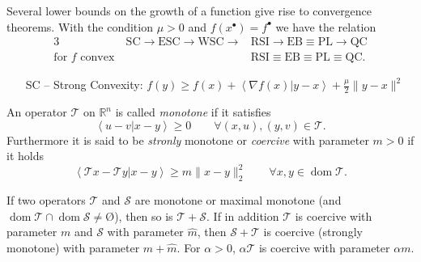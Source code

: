 \documentclass[varwidth=15cm, border=.5cm]{standalone}
\DeclareMathOperator{\domain}{dom}
\newcommand{\innerp}[2]{\left\langle #1 \vert #2 \right\rangle}
\newcommand{\optimal}[1]{{#1^{\scriptscriptstyle\bullet}}}
\renewcommand*{\emptyset}{\text{\O}}
\begin{document}
\begin{remark}[label=9wm37o_t, name=Relationship between optimality bounds]
	Several lower bounds on the growth of a function give rise to
	convergence theorems. With the condition \(\mu>0\) and \(f(\optimal{x}) = 
	\optimal{f}\) we have the relation
	\begin{alignat}{3}
		&\text{SC}\to\text{ESC}\to\text{WSC}\to&\text{RSI}\to\text{EB}\equiv\text{PL}\to\text{QC} \\
		\text{for } f \text{ convex}~&&\text{RSI}\equiv\text{EB}\equiv\text{PL}\equiv\text{QC}.
	\end{alignat}

	\begin{enumerate}
		\item[SC --] Strong Convexity: \(f(y) \geq f(x) + \innerp{\nabla f(x)}{y-x} + \frac{\mu}{2}\lVert y-x\rVert^2\)
	\end{enumerate}
\end{remark}

\begin{definition}[label=1_xd5vw5, name=Monotone Operators and Coercivity]
	An operator \(\mathcal T\) on \(\mathbb R^n\) is called \textit{monotone} if it satisfies
	\[
		\innerp{u-v}{x-y} \geq 0\qquad\forall(x,u), (y,v)\in\mathcal T.
	\]
	Furthermore it is said to be \textit{stronly} monotone or \textit{coercive} with
	parameter \( m > 0\) if it holds
	\[
		\innerp{\mathcal T x- \mathcal T y}{x-y}\geq m\lVert x -
		y\rVert^2_2 \qquad \forall x,y\in\domain\mathcal T.
	\]

	If two operators \(\mathcal T\) and \(\mathcal S\) are monotone or maximal monotone (and 
	\(\domain\mathcal T\cap\domain\mathcal S \neq \emptyset \)), then so is \(\mathcal T + \mathcal S\). If in addition \(\mathcal T\) is coercive
	with parameter \(m\) and \(\mathcal S\) with parameter \(\hat{m}\), then \(\mathcal S + \mathcal T\) is coercive 
	(strongly monotone) with parameter \(m+\hat{m}\). For \(\alpha>0\), \(\alpha\mathcal T\) is coercive 
	with parameter \(\alpha m\).
\end{definition}
\end{document}
